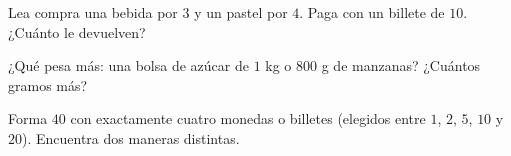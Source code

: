 \begin{exercise}[$\star$]\label{exo:g2:measure:8}
Lea compra una bebida por $3$ y un pastel por $4$. Paga con un billete de
$10$. ¿Cuánto le devuelven?
\end{exercise}

\begin{exercise}[$\star$]\label{exo:g2:measure:9}
¿Qué pesa más: una bolsa de azúcar de $1$ kg o $800$ g de manzanas? ¿Cuántos
gramos más?
\end{exercise}

\begin{exercise}[$\star\star$]\label{exo:g2:measure:10}
Forma $40$ con exactamente cuatro monedas o billetes (elegidos entre $1$, $2$,
$5$, $10$ y $20$). Encuentra dos maneras distintas.
\end{exercise}
